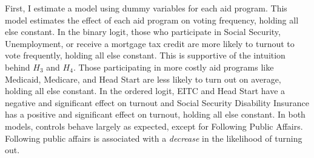 \documentclass[12pt]{paper}
\begin{document}
First, I estimate a model using dummy variables for each aid program. This model estimates the effect of each aid program on voting frequency, holding all else constant. In the binary logit, those who participate in Social Security, Unemployment, or receive a mortgage tax credit are more likely to turnout to vote frequently, holding all else constant. This is supportive of the intuition behind $H_3$ and $H_4$. Those participating in more costly aid programs like Medicaid, Medicare, and Head Start are less likely to turn out on average, holding all else constant. In the ordered logit, EITC and Head Start have a negative and significant effect on turnout and Social Security Disability Insurance has a positive and significant effect on turnout, holding all else constant. In both models, controls behave largely as expected, except for Following Public Affairs. Following public affairs is associated with a \textit{decrease} in the likelihood of turning out.
\end{document}
